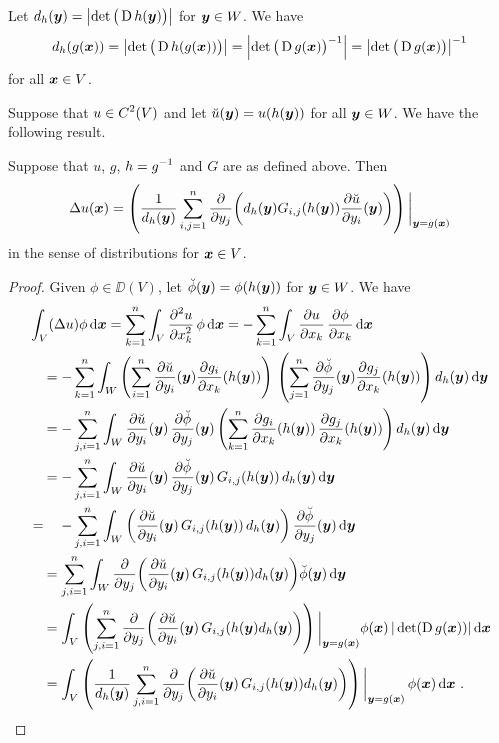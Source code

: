 Let $d_h(\VEC{y}) = \left|\det \big(\diff h(\VEC{y})\big)\right|$
for $\VEC{y} \in W$.  We have
\[
d_h(g(\VEC{x})) = \left|\det \big(\diff h(g(\VEC{x}))\big)\right|
= \left|\det \big(\diff g(\VEC{x})\big)^{-1} \right|
=\left|\det \big(\diff g(\VEC{x})\big) \right|^{-1}
\]
for all $\VEC{x} \in V$.

Suppose that $\DS u\in C^2(V)$ and let
$\breve{u}(\VEC{y}) = u(h(\VEC{y}))$ for all $\VEC{y} \in W$.
We have the following result.

\begin{prop}
Suppose that $u$, $g$, $\DS h = g^{-1}$ and $G$ are as
defined above.  Then
\begin{equation} \label{pot_chain_rule}
\Delta u (\VEC{x}) = \left(
\frac{1}{d_h(\VEC{y})} \sum_{i,j=1}^n
\pdfdx{ \left( d_h(\VEC{y}) G_{i,j}(h(\VEC{y}))
\pdydx{\breve{u}}{y_i}(\VEC{y})\right)}{y_j} \right)\bigg|_{\VEC{y} = g(\VEC{x})}
\end{equation}
in the sense of distributions for $\VEC{x} \in V$.
\end{prop}

\begin{proof}
Given $\phi \in \DD(V)$, let $\breve{\phi}(\VEC{y}) = \phi(h(\VEC{y}))$
for $\VEC{y} \in W$.  We have
\begin{align*}
&\int_V (\Delta u) \phi \dx{\VEC{x}}
= \sum_{k=1}^n \int_V \pdydxn{u}{x_k}{2}\,\phi \dx{\VEC{x}}
= -\sum_{k=1}^n \int_V \pdydx{u}{x_k}\,\pdydx{\phi}{x_k} \dx{\VEC{x}} \\
&\quad = -\sum_{k=1}^n \int_W \left( \sum_{i=1}^n \pdydx{\breve{u}}{y_i}(\VEC{y})
\pdydx{g_i}{x_k}(h(\VEC{y})) \right)\,
\left( \sum_{j=1}^n \pdydx{\breve{\phi}}{y_j}(\VEC{y})
\pdydx{g_j}{x_k}(h(\VEC{y})) \right) d_h(\VEC{y}) \dx{\VEC{y}} \\
&\quad = - \sum_{j,i=1}^n \int_W \pdydx{\breve{u}}{y_i}(\VEC{y})\,
\pdydx{\breve{\phi}}{y_j}(\VEC{y})
\left( \sum_{k=1}^n \pdydx{g_i}{x_k}(h(\VEC{y}))\,\pdydx{g_j}{x_k}(h(\VEC{y}))
\right) d_h(\VEC{y}) \dx{\VEC{y}} \\
&\quad =- \sum_{j,i=1}^n \int_W \pdydx{\breve{u}}{y_i}(\VEC{y})
\, \pdydx{\breve{\phi}}{y_j}(\VEC{y})
\, G_{i,j}(h(\VEC{y}))\, d_h(\VEC{y}) \dx{\VEC{y}}\\
&=\quad  - \sum_{j,i=1}^n \int_W \left( \pdydx{\breve{u}}{y_i}(\VEC{y})
\, G_{i,j}(h(\VEC{y}))\, d_h(\VEC{y}) \right)
\pdydx{\breve{\phi}}{y_j}(\VEC{y}) \dx{\VEC{y}} \\ 
&\quad = \sum_{j,i=1}^n \int_W \pdfdx{\left( \pdydx{\breve{u}}{y_i}(\VEC{y})
\, G_{i,j}(h(\VEC{y})) d_h(\VEC{y}) \right)}{y_j} \breve{\phi}(\VEC{y})
\dx{\VEC{y}} \\
&\quad = \int_V \left( \sum_{j,i=1}^n \pdfdx{\left(
\pdydx{\breve{u}}{y_i}(\VEC{y}) \, G_{i,j}(h(\VEC{y})
d_h(\VEC{y}) \right)}{y_j} \right)\bigg|_{\VEC{y}=g(\VEC{x})}
\phi(\VEC{x})\, |\det (\diff g(\VEC{x}))| \dx{\VEC{x}} \\
&\quad = \int_V \left(\frac{1}{d_h(\VEC{y})}  \sum_{j,i=1}^n
\pdfdx{\left( \pdydx{\breve{u}}{y_i}(\VEC{y})
\, G_{i,j}(h(\VEC{y})) d_h(\VEC{y}) \right)}{y_j}
\right)\bigg|_{\VEC{y}=g(\VEC{x})} \, \phi(\VEC{x}) \dx{\VEC{x}} \ .  \qedhere
\end{align*}
\end{proof}

